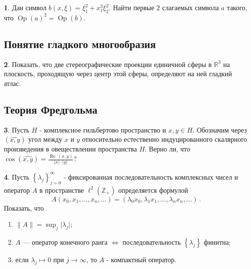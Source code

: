 \documentclass[a4paper, 12pt]{article}
\theoremstyle{definition}
\newtheorem{exercise}{}
\begin{document}
\begin{exercise}
    Дан символ \({ b(x, \xi) = \xi_1^2 + x_1^3 \xi_2^2 }\). Найти первые \({ 2 }\) слагаемых символа \({ a }\) такого, что \({ \operatorname{Op}(a)^2 = \operatorname{Op}(b) }\).
\end{exercise}

\subsection{Понятие гладкого многообразия} %

\begin{exercise}
    Показать, что две стереографические проекции единичной сферы в \({ \mathbb R^{3} }\) на плоскость, проходящую через центр этой сферы, определяют на ней гладкий атлас.
\end{exercise}

\subsection{Теория Фредгольма} %

\begin{exercise}
    Пусть \({ H }\) - комплексное гильбертово пространство и \({ x, y \in H }\).
    Обозначим через \({ (\widehat{x, y}) }\) угол между \({ x }\) и \({ y }\) относительно естественно индуцированного скалярного произведения в овеществлении пространства \({ H }\).
    Верно ли, что \({ \cos (\widehat{x, y}) = \frac{\operatorname{Re}\, (x, y)}{\lvert x \rvert \cdot \lvert y \rvert} }\)?
\end{exercise}

\begin{exercise}
    Пусть \({ \left\{ \lambda_j \right\}_{j=0}^{\infty} }\) - фиксированная последовательность комплексных чисел и оператор \({ A }\) в пространстве \({ \ell^2(\mathbb Z_{+}) }\) определяется формулой \[
        A(x_0, x_1, \ldots, x_n, \ldots) = (\lambda_0 x_0, \lambda_1 x_1, \ldots, \lambda_n x_n, \ldots)\,.
    \] Показать, что 
    \begin{enumerate}
        \item \({ \lVert A \rVert = \sup_{j} \lvert \lambda_j \rvert }\);
        \item \({ A }\) --- оператор конечного ранга \({ \iff }\) последовательность \({ \left\{ \lambda_j \right\} }\) финитна;
        \item если \({ \lambda_j \mapsto 0 }\) при \({ j \to \infty }\), то \({ A }\) - компактный оператор.
    \end{enumerate}
\end{exercise}
\end{document}
